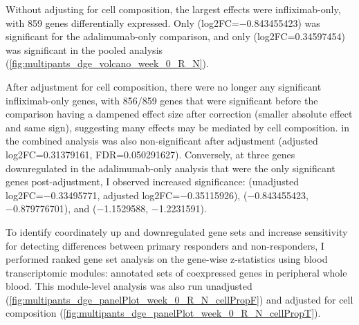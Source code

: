 \begin{outline}
Without adjusting for cell composition, the largest effects were infliximab-only, with 859 genes differentially expressed.
Only  (log2FC=\num{-0.843455423}) was significant for the adalimumab-only comparison, 
and only  (log2FC=\num{0.34597454}) was significant in the pooled analysis (\autoref{fig:multipants_dge_volcano_week_0_R_N}).

After adjustment for cell composition, there were no longer any significant infliximab-only genes, 
with 856/859 genes that were significant before the comparison having a dampened effect size after correction (smaller absolute effect and same sign), suggesting many effects may be mediated by cell composition.
 in the combined analysis was also non-significant after adjustment (adjusted log2FC=\num{0.31379161}, FDR=\num{0.050291627}).
Conversely, at three genes downregulated in the adalimumab-only analysis that were the only significant genes post-adjustment, I observed increased significance:
 (unadjusted log2FC=\num{-0.33495771}, adjusted log2FC=\num{-0.35115926}), 
 (\num{-0.843455423}, \num{-0.879776701}), 
and  (\num{-1.1529588}, \num{-1.2231591}).

To identify coordinately up and downregulated gene sets and increase sensitivity for detecting differences between primary responders and non-responders,
I performed ranked gene set analysis on the gene-wise z-statistics using blood transcriptomic modules: annotated sets of coexpressed genes in peripheral whole blood.
This module-level analysis was also run unadjusted (\autoref{fig:multipants_dge_panelPlot_week_0_R_N_cellPropF}) and adjusted for cell composition (\autoref{fig:multipants_dge_panelPlot_week_0_R_N_cellPropT}).


\end{outline}
